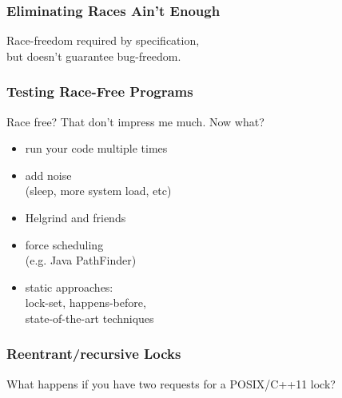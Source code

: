 \documentclass{beamer}
\newenvironment{changemargin}[1]{%
  \begin{list}{}{%
    \setlength{\topsep}{0pt}%
    \setlength{\leftmargin}{#1}%
    \setlength{\rightmargin}{1em}
    \setlength{\listparindent}{\parindent}%
    \setlength{\itemindent}{\parindent}%
    \setlength{\parsep}{\parskip}%
  }%
  \item[]}{\end{list}}
\begin{document}
\begin{frame}
  \frametitle{Eliminating Races Ain't Enough}
  \begin{changemargin}{2cm}
    Race-freedom required by specification,\\
    but doesn't guarantee bug-freedom.\\[1em]

    {\scriptsize
      
      }
  \end{changemargin}
\end{frame}

\begin{frame}
  \frametitle{Testing Race-Free Programs}
  \begin{changemargin}{2cm}
    \Large
    Race free? That don't impress me much. Now what?
    \begin{itemize}
    \item run your code multiple times
    \item add noise\\ \hspace*{2em} (sleep, more system load, etc)
    \item Helgrind and friends
    \item force scheduling\\ \hspace*{2em} (e.g. Java PathFinder)
    \item static approaches: \\ \hspace*{2em} lock-set, happens-before,\\
      \hspace*{2em} state-of-the-art techniques
    \end{itemize}
    
  \end{changemargin}
\end{frame}

\begin{frame}
  \frametitle{Reentrant/recursive Locks}
  \begin{changemargin}{2cm}
    What happens if you have two requests for a POSIX/C++11 lock?\\[1em]
  \end{changemargin}
\end{frame}
      
\end{document}
